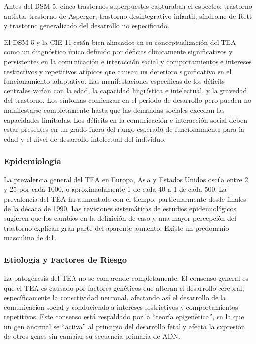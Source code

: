 \documentclass[11pt,letterpaper]{report}
\begin{document}
Antes del DSM-5, cinco trastornos superpuestos capturaban el espectro:
trastorno autista, trastorno de Asperger, trastorno desintegrativo infantil,
síndrome de Rett y trastorno generalizado del desarrollo no especificado.
\cite{Boland2021-by}

El DSM-5 y la CIE-11 están bien alineados en su conceptualización del TEA como
un diagnóstico único definido por déficits clínicamente significativos y
persistentes en la comunicación e interacción social y comportamientos e
intereses restrictivos y repetitivos atípicos que causan un deterioro
significativo en el funcionamiento adaptativo. Las manifestaciones específicas
de los déficits centrales varían con la edad, la capacidad lingüística e
intelectual, y la gravedad del trastorno. Los síntomas comienzan en el período
de desarrollo pero pueden no manifestarse completamente hasta que las demandas
sociales excedan las capacidades limitadas. Los déficits en la comunicación e
interacción social deben estar presentes en un grado fuera del rango esperado
de funcionamiento para la edad y el nivel de desarrollo intelectual del
individuo. \cite{DSM5TR, Myers2025}

\subsubsection{Epidemiología}
La prevalencia general del TEA en Europa, Asia y Estados Unidos oscila entre 2
y 25 por cada 1000, o aproximadamente 1 de cada 40 a 1 de cada 500. La
prevalencia del TEA ha aumentado con el tiempo, particularmente desde finales
de la década de 1990. Las revisiones sistemáticas de estudios epidemiológicos
sugieren que los cambios en la definición de caso y una mayor percepción del
trastorno explican gran parte del aparente aumento. Existe un predominio
masculino de 4:1. \cite{AutismUpToDate, Nelson58}

\subsubsection{Etiología y Factores de Riesgo}
La patogénesis del TEA no se comprende completamente. El consenso general es
que el TEA es causado por factores genéticos que alteran el desarrollo
cerebral, específicamente la conectividad neuronal, afectando así el
desarrollo de la comunicación social y conduciendo a intereses restrictivos y
comportamientos repetitivos. Este consenso está respaldado por la ``teoría
epigenética'', en la que un gen anormal se ``activa'' al principio del
desarrollo fetal y afecta la expresión de otros genes sin cambiar su secuencia
primaria de ADN. \cite{AutismUpToDate}
\end{document}
